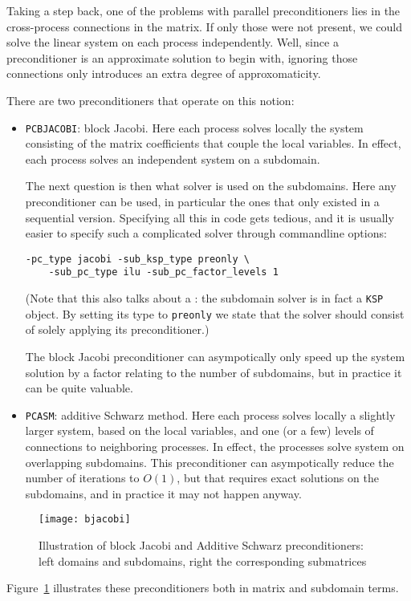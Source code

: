 Taking a step back, one of the problems with parallel preconditioners
lies in the cross-process connections in the matrix. If only those were not present,
we could solve the linear system on each process independently.
Well, since a preconditioner is an approximate solution to begin with,
ignoring those connections only introduces an extra degree of approxomaticity.

There are two preconditioners that operate on this notion:
\begin{itemize}
\item \lstinline{PCBJACOBI}: block Jacobi. Here each process solves locally the system
  consisting of the matrix coefficients that couple the local variables.
  In effect, each process solves an independent system on a subdomain.

  The next question is then what solver is used on the subdomains.
  Here any preconditioner can be used, in particular the ones that only
  existed in a sequential version. Specifying all this in code gets tedious,
  and it is usually easier to specify such a complicated solver through
  commandline options:
\begin{verbatim}
-pc_type jacobi -sub_ksp_type preonly \
    -sub_pc_type ilu -sub_pc_factor_levels 1 
\end{verbatim}
(Note that this also talks about a : the subdomain solver is in fact
a \lstinline{KSP} object. By setting its type to \lstinline{preonly} we state that the
solver should consist of solely applying its preconditioner.)

  The block Jacobi preconditioner can asympotically only speed up the
  system solution by a factor relating to the number of subdomains,
  but in practice it can be quite valuable.
\item \lstinline{PCASM}: additive Schwarz method. Here each process
  solves locally a slightly larger system, based on the local
  variables, and one (or a few) levels of connections to neighboring processes.
  In effect, the processes solve system on overlapping subdomains.
  This preconditioner can asympotically reduce the number of iterations to $O(1)$,
  but that requires exact solutions on the subdomains, and in practice it may
  not happen anyway.
\end{itemize}

\begin{figure}[ht]
  \texttt{[image: bjacobi]}
  \caption{Illustration of block Jacobi and Additive Schwarz preconditioners:
  left domains and subdomains, right the corresponding submatrices}
  \label{fig:bjacobi}
\end{figure}
Figure~\ref{fig:bjacobi} illustrates these preconditioners both in
matrix and subdomain terms.

